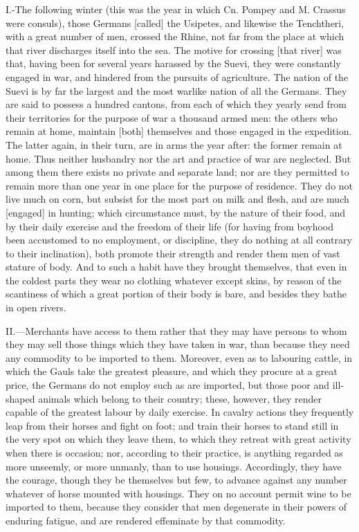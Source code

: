 I.-The following winter (this was the year in which Cn. Pompey and M.
Crassus were consuls), those Germans [called] the Usipetes, and likewise
the Tenchtheri, with a great number of men, crossed the Rhine, not far
from the place at which that river discharges itself into the sea. The
motive for crossing [that river] was that, having been for several years
harassed by the Suevi, they were constantly engaged in war, and hindered
from the pursuits of agriculture. The nation of the Suevi is by far the
largest and the most warlike nation of all the Germans. They are said to
possess a hundred cantons, from each of which they yearly send from
their territories for the purpose of war a thousand armed men: the
others who remain at home, maintain [both] themselves and those engaged
in the expedition. The latter again, in their turn, are in arms the year
after: the former remain at home. Thus neither husbandry nor the art and
practice of war are neglected. But among them there exists no private
and separate land; nor are they permitted to remain more than one year
in one place for the purpose of residence. They do not live much on
corn, but subsist for the most part on milk and flesh, and are much
[engaged] in hunting; which circumstance must, by the nature of their
food, and by their daily exercise and the freedom of their life (for
having from boyhood been accustomed to no employment, or discipline,
they do nothing at all contrary to their inclination), both promote
their strength and render them men of vast stature of body. And to such
a habit have they brought themselves, that even in the coldest parts
they wear no clothing whatever except skins, by reason of the scantiness
of which a great portion of their body is bare, and besides they bathe
in open rivers.

II.—Merchants have access to them rather that they may have persons to
whom they may sell those things which they have taken in war, than
because they need any commodity to be imported to them. Moreover, even
as to labouring cattle, in which the Gauls take the greatest pleasure,
and which they procure at a great price, the Germans do not employ such
as are imported, but those poor and ill-shaped animals which belong to
their country; these, however, they render capable of the greatest
labour by daily exercise. In cavalry actions they frequently leap from
their horses and fight on foot; and train their horses to stand still in
the very spot on which they leave them, to which they retreat with great
activity when there is occasion; nor, according to their practice, is
anything regarded as more unseemly, or more unmanly, than to use
housings. Accordingly, they have the courage, though they be themselves
but few, to advance against any number whatever of horse mounted with
housings. They on no account permit wine to be imported to them, because
they consider that men degenerate in their powers of enduring fatigue,
and are rendered effeminate by that commodity.

